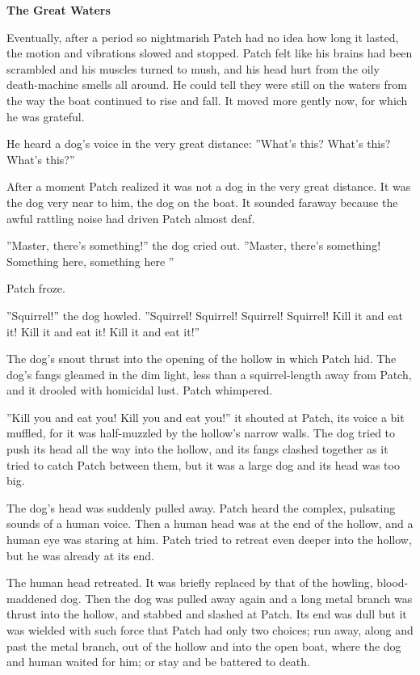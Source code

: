 \documentclass[11pt]{article}
\begin{document}
{\bf The Great Waters\par
}\par
 Eventually, after a period so nightmarish Patch had no idea how long it lasted, the motion and vibrations slowed and stopped. Patch felt like his brains had been scrambled and his muscles turned to mush, and his head hurt from the oily death-machine smells all around. He could tell they were still on the waters from the way the boat continued to rise and fall. It moved more gently now, for which he was grateful.\par
 He heard a dog's voice in the very great distance: ''What's this? What's this? What's this?''\par
 After a moment Patch realized it was not a dog in the very great distance. It was the dog very near to him, the dog on the boat. It sounded faraway because the awful rattling noise had driven Patch almost deaf.\par
 ''Master, there's something!'' the dog cried out. ''Master, there's something! Something here, something here %
 ''\par
Patch froze.\par
''Squirrel!'' the dog howled. ''Squirrel! Squirrel! Squirrel! Squirrel! Kill it and eat it! Kill it and eat it! Kill it and eat it!''\par
 The dog's snout thrust into the opening of the hollow in which Patch hid. The dog's fangs gleamed in the dim light, less than a squirrel-length away from Patch, and it drooled with homicidal lust. Patch whimpered.\par
 ''Kill you and eat you! Kill you and eat you!'' it shouted at Patch, its voice a bit muffled, for it was half-muzzled by the hollow's narrow walls. The dog tried to push its head all the way into the hollow, and its fangs clashed together as it tried to catch Patch between them, but it was a large dog and its head was too big.\par
 The dog's head was suddenly pulled away. Patch heard the complex, pulsating sounds of a human voice. Then a human head was at the end of the hollow, and a human eye was staring at him. Patch tried to retreat even deeper into the hollow, but he was already at its end.\par
 The human head retreated. It was briefly replaced by that of the howling, blood-maddened dog. Then the dog was pulled away again %
 and a long metal branch was thrust into the hollow, and stabbed and slashed at Patch. Its end was dull but it was wielded with such force that Patch had only two choices; run away, along and past the metal branch, out of the hollow and into the open boat, where the dog and human waited for him; or stay and be battered to death.\par
\end{document}
